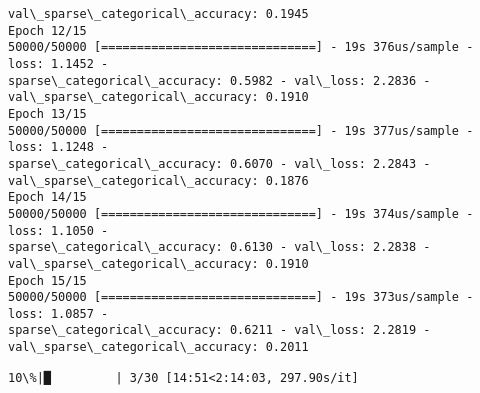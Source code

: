 \documentclass[11pt]{article}
\begin{document}
\begin{Verbatim}[commandchars=\\\{\}]
val\_sparse\_categorical\_accuracy: 0.1945
Epoch 12/15
50000/50000 [==============================] - 19s 376us/sample - loss: 1.1452 -
sparse\_categorical\_accuracy: 0.5982 - val\_loss: 2.2836 -
val\_sparse\_categorical\_accuracy: 0.1910
Epoch 13/15
50000/50000 [==============================] - 19s 377us/sample - loss: 1.1248 -
sparse\_categorical\_accuracy: 0.6070 - val\_loss: 2.2843 -
val\_sparse\_categorical\_accuracy: 0.1876
Epoch 14/15
50000/50000 [==============================] - 19s 374us/sample - loss: 1.1050 -
sparse\_categorical\_accuracy: 0.6130 - val\_loss: 2.2838 -
val\_sparse\_categorical\_accuracy: 0.1910
Epoch 15/15
50000/50000 [==============================] - 19s 373us/sample - loss: 1.0857 -
sparse\_categorical\_accuracy: 0.6211 - val\_loss: 2.2819 -
val\_sparse\_categorical\_accuracy: 0.2011
    \end{Verbatim}

    \begin{Verbatim}[commandchars=\\\{\}]
 10\%|█         | 3/30 [14:51<2:14:03, 297.90s/it]
    \end{Verbatim}
\end{document}
